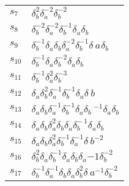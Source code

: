 \documentclass{article}
\begin{document}
\begin{center}
\begin{tabular}{ll}
$s_{7}$ & $\delta_b^{2}\delta_a^{-2}\delta_b^{-2}$ \\
$s_{8}$ & $\delta_b^{-2}\delta_a^{-2}\delta_b^{-1}\delta_a^{}\delta_b^{}$ \\
$s_{9}$ & $\delta_b^{-1}\delta_a^{}\delta_b^{}\delta_a^{-2}\delta_b^{-1}\delta_\
a^{}\delta_b^{}$ \\
$s_{10}$ & $\delta_b^{-1}\delta_a^{}\delta_b^{-2}\delta_a^{}\delta_b^{}$ \\
$s_{11}$ & $\delta_b^{-1}\delta_a^{2}\delta_b^{-3}$ \\
$s_{12}$ & $\delta_a^{}\delta_b^{2}\delta_a^{-1}\delta_b^{-1}\delta_a^{}\delta_\
b^{}$ \\
$s_{13}$ & $\delta_a^{}\delta_b^{}\delta_a^{-1}\delta_b^{-1}\delta_a^{}\delta_b\
^{-1}\delta_a^{}\delta_b^{}$ \\
$s_{14}$ & $\delta_a^{}\delta_b^{}\delta_a^{2}\delta_b^{}\delta_a^{}\delta_b^{-\
1}\delta_a^{}\delta_b^{}$ \\
$s_{15}$ & $\delta_a^{}\delta_b^{}\delta_a^{2}\delta_b^{-1}\delta_a^{-1}\delta_\
b^{-2}$ \\
$s_{16}$ & $\delta_b^{2}\delta_a^{}\delta_b^{-1}\delta_a^{}\delta_b^{}\delta_a^\
{-1}\delta_b^{-2}$ \\
$s_{17}$ & $\delta_b^{-1}\delta_a^{-1}\delta_b^{}\delta_a^{}\delta_b^{2}\delta_\
a^{-1}\delta_b^{-2}$ \\
\bottomrule
\end{tabular}
\end{center}

\thispagestyle{empty}
\end{document}
